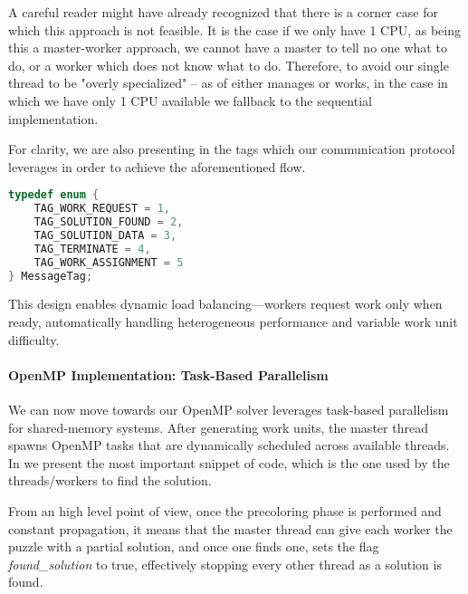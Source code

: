 A careful reader might have already recognized that there is a corner case for which this approach is not feasible. It is the case if we only have 1 CPU, as being this a master-worker approach, we cannot have a master to tell no one what to do, or a worker which does not know what to do. Therefore, to avoid our single thread to be "overly specialized" -- as of either manages or works, in the case in which we have only 1 CPU available we fallback to the sequential implementation.

For clarity, we are also presenting in  the tags which our communication protocol leverages in order to achieve the aforementioned flow.

\begin{lstlisting}[language=C, caption=MPI communication tags, label={listing:message_tags}]
typedef enum {
    TAG_WORK_REQUEST = 1,
    TAG_SOLUTION_FOUND = 2,
    TAG_SOLUTION_DATA = 3,
    TAG_TERMINATE = 4,
    TAG_WORK_ASSIGNMENT = 5
} MessageTag;
\end{lstlisting}
This design enables dynamic load balancing—workers request work only when ready, automatically handling heterogeneous performance and variable work unit difficulty.


\paragraph{OpenMP Implementation: Task-Based Parallelism}
\label{par:omp_implementation}
We can now move towards our OpenMP solver leverages task-based parallelism for shared-memory systems. After generating work units, the master thread spawns OpenMP tasks that are dynamically scheduled across available threads. In  we present the most important snippet of code, which is the one used by the threads/workers to find the solution.

From an high level point of view, once the precoloring phase is performed and constant propagation, it means that the master thread can give each worker the puzzle with a partial solution, and once one finds one, sets the flag \textit{found\_solution} to true, effectively stopping every other thread as a solution is found. 


